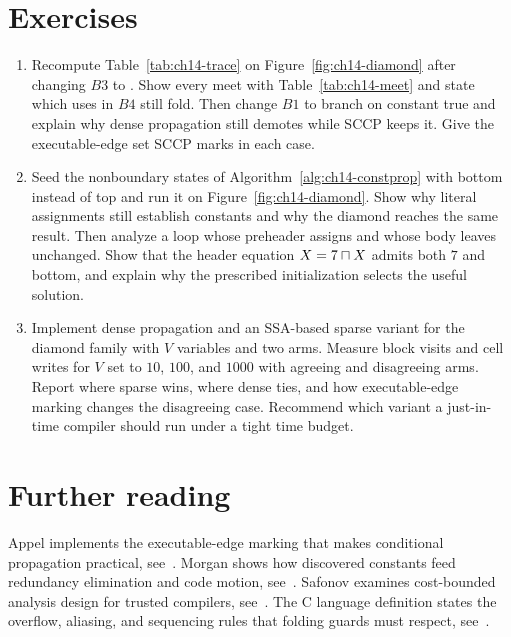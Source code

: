 \section{Exercises}
\label{sec:ch14-exercises}

\begin{enumerate}
\item \label{ex:ch14-hand-variant} Recompute Table~\ref{tab:ch14-trace} on Figure~\ref{fig:ch14-diamond} after changing $B3$ to .
Show every meet with Table~\ref{tab:ch14-meet} and state which uses in $B4$ still fold.
Then change $B1$ to branch on constant true and explain why dense propagation still demotes  while SCCP keeps it.
Give the executable-edge set SCCP marks in each case.
\item \label{ex:ch14-bottom-poison} Seed the nonboundary states of Algorithm~\ref{alg:ch14-constprop} with bottom instead of top and run it on Figure~\ref{fig:ch14-diamond}.
Show why literal assignments still establish constants and why the diamond reaches the same result.
Then analyze a loop whose preheader assigns  and whose body leaves  unchanged.
Show that the header equation $X=7\sqcap X$ admits both $7$ and bottom, and explain why the prescribed initialization selects the useful solution.
\item \label{ex:ch14-sparse-build} Implement dense propagation and an SSA-based sparse variant for the diamond family with $V$ variables and two arms.
Measure block visits and cell writes for $V$ set to $10$, $100$, and $1000$ with agreeing and disagreeing arms.
Report where sparse wins, where dense ties, and how executable-edge marking changes the disagreeing case.
Recommend which variant a just-in-time compiler should run under a tight time budget.
\end{enumerate}

\section{Further reading}
\label{sec:ch14-reading}

Appel implements the executable-edge marking that makes conditional propagation practical, see~\cite{appel-1998-modern}.
Morgan shows how discovered constants feed redundancy elimination and code motion, see~\cite{morgan-1998-optimizing}.
Safonov examines cost-bounded analysis design for trusted compilers, see~\cite{safonov-2010-trustworthy}.
The C language definition states the overflow, aliasing, and sequencing rules that folding guards must respect, see~\cite{wg14-2011-c11}.
